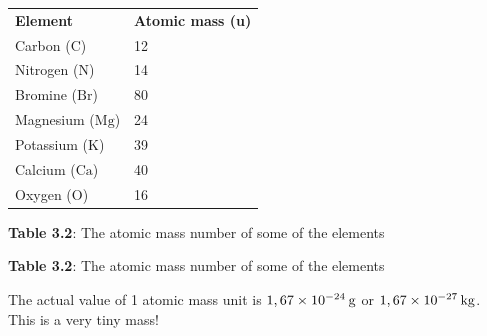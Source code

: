           \begin{table}[H]
        \begin{center}
      \label{m38756*uid8}
    \noindent
      \tablelasttail{}
      \begin{xtabular}[t]{|l|l|}\hline
                  \textbf{Element}
                 &
                  \textbf{Atomic mass (u)}
     \tabularnewline{}
        Carbon ($\mathrm{C}$) &
        12%
     \tabularnewline{}
        Nitrogen ($\mathrm{N}$) &
        14%
     \tabularnewline{}
        Bromine ($\mathrm{Br}$) &
        80%
     \tabularnewline{}
        Magnesium ($\mathrm{Mg}$) &
        24%
     \tabularnewline{}
        Potassium ($\mathrm{K}$) &
        39%
     \tabularnewline{}
        Calcium ($\mathrm{Ca}$) &
        40%
     \tabularnewline{}
        Oxygen ($\mathrm{O}$) &
        16%
     \tabularnewline{}
    \end{xtabular}
      \end{center}
    \begin{center}{\small\bfseries Table 3.2}: The atomic mass number of some of the elements\end{center}
    \begin{caption}{\small\bfseries Table 3.2}: The atomic mass number of some of the elements\end{caption}
\end{table}
    \par
        \label{m38756*id255096}The actual value of 1 atomic mass unit is $1,67\ensuremath{\times}{10}^{-24}\phantom{\rule{2pt}{0ex}}\mathrm{g}$ or $1,67\ensuremath{\times}{10}^{-27}\phantom{\rule{2pt}{0ex}}\mathrm{kg}$. This is a very tiny mass!\par 
      \label{m38756*uid9}
